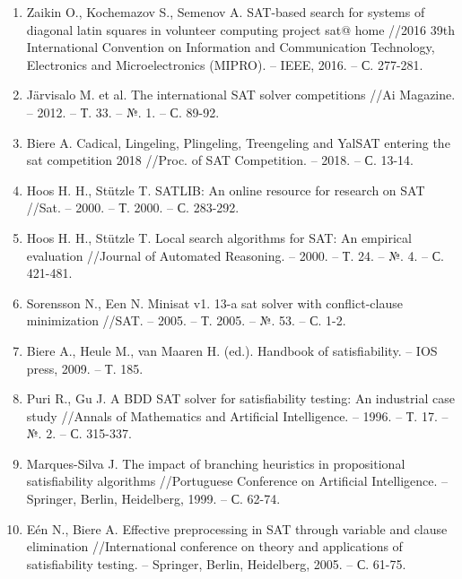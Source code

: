 \begin{enumerate}
\item\label{bib:ZaikinKochemazovSemenov}
Zaikin O., Kochemazov S., Semenov A. SAT-based search for systems of diagonal latin squares in volunteer computing project sat@ home //2016 39th International Convention on Information and Communication Technology, Electronics and Microelectronics (MIPRO). – IEEE, 2016. – С. 277-281.

\item\label{bib:Järvisalo}
Järvisalo M. et al. The international SAT solver competitions //Ai Magazine. – 2012. – Т. 33. – №. 1. – С. 89-92.
	
\item\label{bib:BiereCadical}
Biere A. Cadical, Lingeling, Plingeling, Treengeling and YalSAT entering the sat competition 2018 //Proc. of SAT Competition. – 2018. – С. 13-14.

\item\label{bib:HoosStützle}
Hoos H. H., Stützle T. SATLIB: An online resource for research on SAT //Sat. – 2000. – Т. 2000. – С. 283-292.

\item\label{bib:HoosWalkSAT}
Hoos H. H., Stützle T. Local search algorithms for SAT: An empirical evaluation //Journal of Automated Reasoning. – 2000. – Т. 24. – №. 4. – С. 421-481.

\item\label{bib:Sorensson}
Sorensson N., Een N. Minisat v1. 13-a sat solver with conflict-clause minimization //SAT. – 2005. – Т. 2005. – №. 53. – С. 1-2.

\item\label{bib:BiereHeule}
Biere A., Heule M., van Maaren H. (ed.). Handbook of satisfiability. – IOS press, 2009. – Т. 185.

\item\label{bib:Puri}
Puri R., Gu J. A BDD SAT solver for satisfiability testing: An industrial case study //Annals of Mathematics and Artificial Intelligence. – 1996. – Т. 17. – №. 2. – С. 315-337.

\item\label{bib:MarquesSilva1999}
Marques-Silva J. The impact of branching heuristics in propositional satisfiability algorithms //Portuguese Conference on Artificial Intelligence. – Springer, Berlin, Heidelberg, 1999. – С. 62-74.

\item\label{bib:EénBiere}
Eén N., Biere A. Effective preprocessing in SAT through variable and clause elimination //International conference on theory and applications of satisfiability testing. – Springer, Berlin, Heidelberg, 2005. – С. 61-75.


\end{enumerate}
